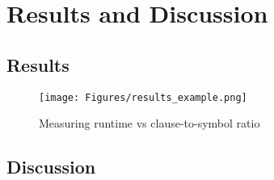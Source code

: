\chapter{Results and Discussion} 
\label{Results}







\section{Results}

\begin{figure}[H]
    \centering
    \texttt{[image: Figures/results\_example.png]}
    \caption{Measuring runtime vs clause-to-symbol ratio}
    \label{fig:sysdiag}
\end{figure}

\section{Discussion}


